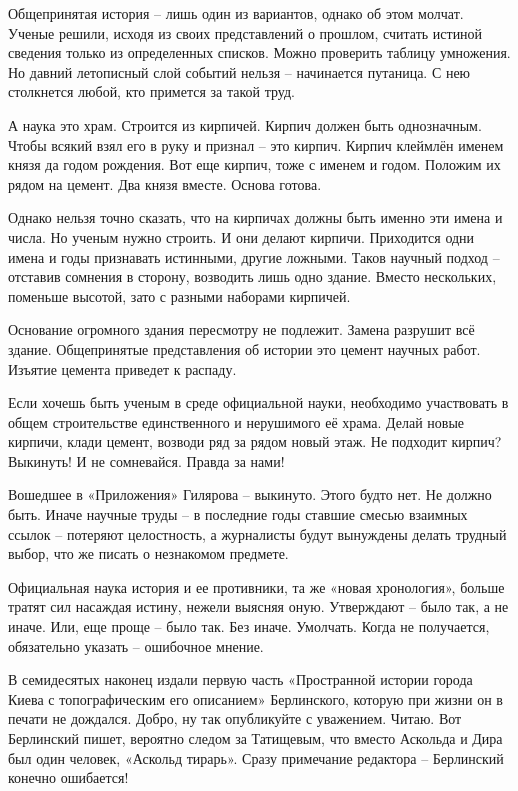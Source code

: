 Общепринятая история – лишь один из вариантов, однако об этом молчат. Ученые решили, исходя из своих представлений о прошлом, считать истиной сведения только из определенных списков. Можно проверить таблицу умножения. Но давний летописный слой событий нельзя – начинается путаница. С нею столкнется любой, кто примется за такой труд.

А наука это храм. Строится из кирпичей. Кирпич должен быть однозначным. Чтобы всякий взял его в руку и признал – это кирпич. Кирпич клеймлён именем князя да годом рождения. Вот еще кирпич, тоже с именем и годом. Положим их рядом на цемент. Два князя вместе. Основа готова.

Однако нельзя точно сказать, что на кирпичах должны быть именно эти имена и числа. Но ученым нужно строить. И они делают кирпичи. Приходится одни имена и годы признавать истинными, другие ложными. Таков научный подход – отставив сомнения в сторону, возводить лишь одно здание. Вместо нескольких, поменьше высотой, зато с разными наборами кирпичей.

Основание огромного здания пересмотру не подлежит. Замена разрушит всё здание. Общепринятые представления об истории это цемент научных работ. Изъятие цемента приведет к распаду.

Если хочешь быть ученым в среде официальной науки, необходимо участвовать в общем строительстве единственного и нерушимого её храма. Делай новые кирпичи, клади цемент, возводи ряд за рядом новый этаж. Не подходит кирпич? Выкинуть! И не сомневайся. Правда за нами!

Вошедшее в «Приложения» Гилярова – выкинуто. Этого будто нет. Не должно быть. Иначе научные труды – в последние годы ставшие смесью взаимных ссылок – потеряют целостность, а журналисты будут вынуждены делать трудный выбор, что же писать о незнакомом предмете.

Официальная наука история и ее противники, та же «новая хронология», больше тратят сил насаждая истину, нежели выясняя оную. Утверждают – было так, а не иначе. Или, еще проще – было так. Без иначе. Умолчать. Когда не получается, обязательно указать – ошибочное мнение.

В семидесятых наконец издали первую часть «Пространной истории города Киева с топографическим его описанием» Берлинского, которую при жизни он в печати не дождался. Добро, ну так опубликуйте с уважением. Читаю.  Вот Берлинский пишет, вероятно следом за Татищевым, что вместо Аскольда и Дира был один человек, «Аскольд тирарь». Сразу примечание редактора – Берлинский конечно ошибается!

